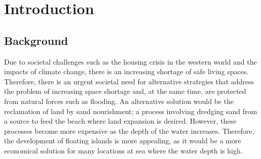 \chapter{Introduction}
\label{chapter:introduction}







\section{Background}
\label{sec:intro background}
Due to societal challenges such as the housing crisis in the western world and the impacts of climate change, there is an increasing shortage of safe living spaces. Therefore, there is an urgent societal need for alternative strategies that address the problem of increasing space shortage and, at the same time, are protected from natural forces such as flooding. An alternative solution would be the reclamation of land by sand nourishment; a process involving dredging sand from a source to feed the beach where land expansion is desired.  However, these processes become more expensive as the depth of the water increases. Therefore, the development of floating islands is more appealing, as it would be a more economical solution for many locations at sea where the water depth is high.  



